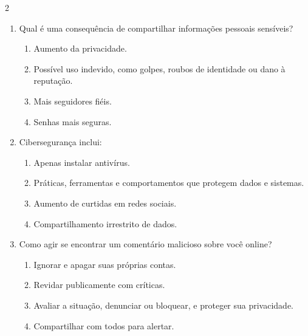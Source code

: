 \documentclass[11pt]{article}
\begin{document}
\begin{multicols}{2}
\begin{enumerate}[leftmargin=*]
\item Qual é uma consequência de compartilhar informações pessoais sensíveis?
\begin{enumerate}[label=\alph*)]
\item Aumento da privacidade.
\item Possível uso indevido, como golpes, roubos de identidade ou dano à reputação.
\item Mais seguidores fiéis.
\item Senhas mais seguras.
\end{enumerate}

\item Cibersegurança inclui:
\begin{enumerate}[label=\alph*)]
\item Apenas instalar antivírus.
\item Práticas, ferramentas e comportamentos que protegem dados e sistemas.
\item Aumento de curtidas em redes sociais.
\item Compartilhamento irrestrito de dados.
\end{enumerate}

\item Como agir se encontrar um comentário malicioso sobre você online?
\begin{enumerate}[label=\alph*)]
\item Ignorar e apagar suas próprias contas.
\item Revidar publicamente com críticas.
\item Avaliar a situação, denunciar ou bloquear, e proteger sua privacidade.
\item Compartilhar com todos para alertar.
\end{enumerate}

\end{enumerate}


\end{multicols}
\end{document}
